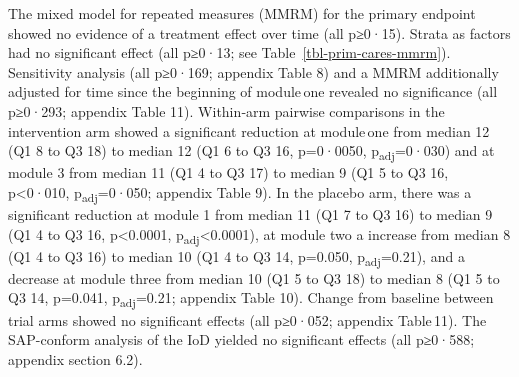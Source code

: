 \documentclass[
  super,
  preprint,
  1p,
  onecolumn]{elsarticle}
\begin{document}
The mixed model for repeated measures (MMRM) for the primary endpoint
showed no evidence of a treatment effect over time (all p≥0·15). Strata
as factors had no significant effect (all p≥0·13; see
Table~\ref{tbl-prim-cares-mmrm}). Sensitivity analysis (all p≥0·169;
appendix Table 8) and a MMRM additionally adjusted for time since the
beginning of module\,one revealed no significance (all p≥0·293; appendix
Table 11). Within‑arm pairwise comparisons in the intervention arm
showed a significant reduction at module\,one from median 12 (Q1 8 to Q3
18) to median 12 (Q1 6 to Q3 16, p=0·0050, p\textsubscript{adj}=0·030)
and at module 3 from median 11 (Q1 4 to Q3 17) to median 9 (Q1 5 to Q3
16, p\textless0·010, p\textsubscript{adj}=0·050; appendix Table 9). In
the placebo arm, there was a significant reduction at module 1 from
median 11 (Q1 7 to Q3 16) to median 9 (Q1 4 to Q3 16, p\textless0.0001,
p\textsubscript{adj}\textless0.0001), at module two a increase from
median 8 (Q1 4 to Q3 16) to median 10 (Q1 4 to Q3 14, p=0.050,
p\textsubscript{adj}=0.21), and a decrease at module three from median
10 (Q1 5 to Q3 18) to median 8 (Q1 5 to Q3 14, p=0.041,
p\textsubscript{adj}=0.21; appendix Table 10). Change from baseline
between trial arms showed no significant effects (all p≥0·052; appendix
Table\,11). The SAP-conform analysis of the IoD yielded no significant
effects (all p≥0·588; appendix section 6.2).

\newpage{}
\end{document}
